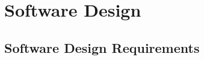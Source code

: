 

\setcounter{section}{5}
\section{Software Design}
\bigskip



\pagebreak
\subsection{Software Design Requirements}